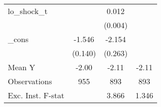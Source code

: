 {\begin{tabular}{l*{3}{c}}
\addlinespace
lo\_shock\_t  &                     &       0.012\sym{***}&                     \\
            &                     &     (0.004)         &                     \\
\addlinespace
\_cons      &      -1.546\sym{***}&      -2.154\sym{***}&                     \\
            &     (0.140)         &     (0.263)         &                     \\
\midrule
Mean Y      &       -2.00         &       -2.11         &       -2.11         \\
Observations&         955         &         893         &         893         \\
Exc. Inst. F-stat&                     &       3.866         &       1.346         \\
\bottomrule
\end{tabular}
}
